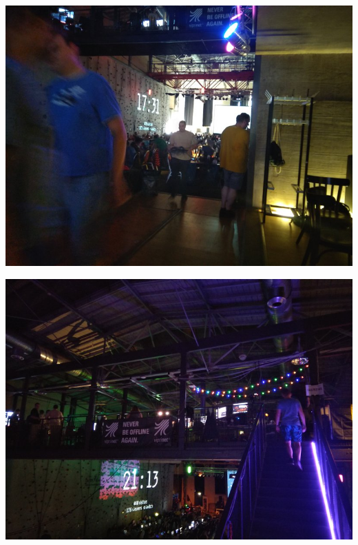 \documentclass{beamer}
\begin{document}
\begin{frame}
  \includegraphics[width=\textwidth]{IMG_20180818_173130}
\end{frame}

\begin{frame}
  \includegraphics[width=\textwidth]{IMG_20180818_211357}
\end{frame}
\end{document}
